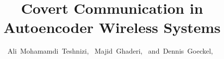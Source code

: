 \documentclass[journal]{IEEEtran}
\begin{document}
		\title{Covert Communication in \\Autoencoder Wireless Systems}
		
		\author{Ali~Mohamamdi~Teshnizi,~
			Majid~Ghaderi,~
			and~Dennis~Goeckel,~%
			}
		
	
	
	
	
\end{document}

